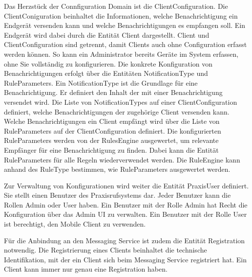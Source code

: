 Das Herzstück der Connfiguration Domain ist die ClientConfiguration.
Die ClientConiguration beinhaltet die Informationen, welche Benachrichtigung ein Endgerät versenden kann und welche Benachrichtigungen es empfangen soll.
Ein Endgerät wird dabei durch die Entität Client dargestellt.
Client und ClientConfiguration sind getrennt, damit Clients auch ohne Configuration erfasst werden können.
So kann ein Administrator bereits Geräte im System erfassen, ohne Sie vollständig zu konfigurieren.
Die konkrete Konfiguration von Benachrichtigungen erfolgt über die Entitäten NotificationType und RuleParameters.
Ein NotificationType ist die Grundlage für eine Benachrichtigung.
Er definiert den Inhalt der mit einer Benachrichtigung versendet wird.
Die Liste von NotificationTypes auf einer ClientConfiguration definiert, welche Benachrichtigungen der zugehörige Client versenden kann.
Welche Benachrichtigungen ein Client empfängt wird über die Liste von RuleParameters auf der ClientConfiguration definiert.
Die konfigurierten RuleParameters werden von der RulesEngine ausgewertet, um relevante Empfänger für eine Benachrichtigung zu finden.
Dabei kann die Entität RuleParameters für alle Regeln wiederverwendet werden.
Die RuleEngine kann anhand des RuleType bestimmen, wie RuleParameters ausgewertet werden.

Zur Verwaltung von Konfigurationen wird weiter die Entität PraxisUser definiert.
Sie stellt einen Benutzer des Praxisrufsystems dar.
Jeder Benutzer kann die Rollen Admin oder User haben.
Ein Benutzer mit der Rolle Admin hat Recht die Konfiguration über das Admin UI zu verwalten.
Ein Benutzer mit der Rolle User ist berechtigt, den Mobile Client zu verwenden.

Für die Anbindung an den Messaging Service ist zudem die Entität Registration notwendig.
Die Registrierung eines Clients beinhaltet die technische Identifikation, mit der ein Client sich beim Messaging Service registriert hat.
Ein Client kann immer nur genau eine Registration haben.

\clearpage

